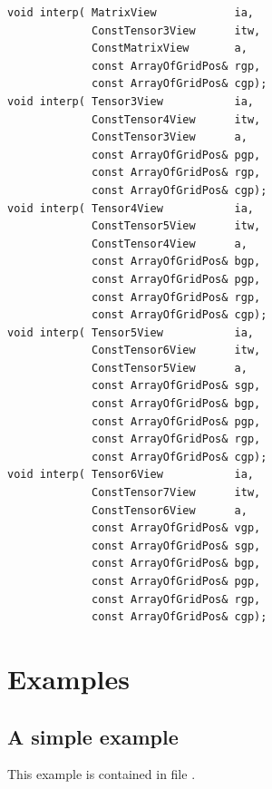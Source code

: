 \begin{lstlisting}
void interp( MatrixView            ia,
             ConstTensor3View      itw,
             ConstMatrixView       a,   
             const ArrayOfGridPos& rgp,
             const ArrayOfGridPos& cgp);
void interp( Tensor3View           ia,
             ConstTensor4View      itw,
             ConstTensor3View      a,   
             const ArrayOfGridPos& pgp,
             const ArrayOfGridPos& rgp,
             const ArrayOfGridPos& cgp);
void interp( Tensor4View           ia,
             ConstTensor5View      itw,
             ConstTensor4View      a,   
             const ArrayOfGridPos& bgp,
             const ArrayOfGridPos& pgp,
             const ArrayOfGridPos& rgp,
             const ArrayOfGridPos& cgp);
void interp( Tensor5View           ia,
             ConstTensor6View      itw,
             ConstTensor5View      a,   
             const ArrayOfGridPos& sgp,
             const ArrayOfGridPos& bgp,
             const ArrayOfGridPos& pgp,
             const ArrayOfGridPos& rgp,
             const ArrayOfGridPos& cgp);
void interp( Tensor6View           ia,
             ConstTensor7View      itw,
             ConstTensor6View      a,   
             const ArrayOfGridPos& vgp,
             const ArrayOfGridPos& sgp,
             const ArrayOfGridPos& bgp,
             const ArrayOfGridPos& pgp,
             const ArrayOfGridPos& rgp,
             const ArrayOfGridPos& cgp);
\end{lstlisting}

\section{Examples}

\subsection{A simple example}

This example is contained in file .


